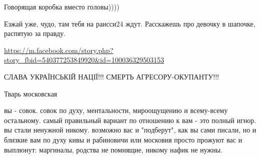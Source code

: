 \begin{itemize}
Говорящая коробка вместо головы))))

 
Езжай уже, чудо, там тебя на раисси24 ждут. Расскажешь про девочку в шапочке, распятую за правду.

 
\url{https://m.facebook.com/story.php?story_fbid=540377253849920&id=100036329503153}

 
СЛАВА УКРАЇНСЬКІЙ НАЦІЇ!!! СМЕРТЬ АГРЕСОРУ-ОКУПАНТУ!!!

 
Тварь московская

 

вы - совок. совок по духу, ментальности, мироощущению и всему-всему остальному.
самый правильный вариант по отношению к вам - это полный игнор. вы стали
ненужной никому. возможно вас и "подберут", как вы сами писали, но и близкие
вам по духу кивы и рабиновичи или московия просто прожуют вас и выплюнут:
маргиналы, родства не помнящие, никому нафик не нужны.

\begin{itemize}
 

\end{itemize}
\end{itemize}
